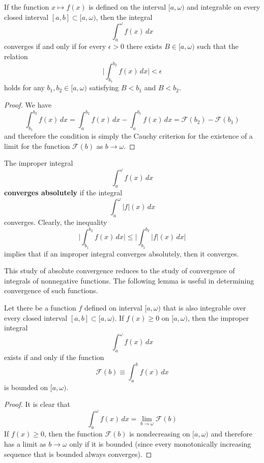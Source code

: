 \documentclass{article}
\begin{document}
        \begin{theorem}
        If the function $x \mapsto f(x)$ is defined on the interval $[a, \omega)$ and integrable on every closed interval $[a, b] \subset [a, \omega)$, then the integral 
        \[\int_a^\omega f(x)\,dx\]
        converges if and only if for every $\epsilon > 0$ there exists $B \in [a, \omega)$ such that the relation
        \[\Bigg| \int_{b_1}^{b_2} f(x)\,dx \bigg| < \epsilon\]
        holds for any $b_1, b_2 \in [a, \omega)$ satisfying $B < b_1$ and $B < b_2$. 
        \end{theorem}
        \begin{proof}
        We have
        \[\int_{b_1}^{b_2} f(x)\,dx = \int_a^{b_2} f(x)\,dx - \int_a^{b_1} f(x)\,dx = \mathcal{F}(b_2) - \mathcal{F}(b_1)\]
        and therefore the condition is simply the Cauchy criterion for the existence of a limit for the function $\mathcal{F}(b)$ as $b \rightarrow \omega$. 
        \end{proof}

        \begin{definition}
          The improper integral 
          \[\int_a^\omega f(x)\,dx\]
          \textbf{converges absolutely} if the integral
          \[\int_a^\omega |f|(x)\,dx\]
          converges. Clearly, the inequality
          \[\Bigg| \int_{b_1}^{b_2} f(x)\,dx \Bigg| \leq \Bigg| \int_{b_1}^{b_2} |f|(x)\,dx \Bigg|\]
          implies that if an improper integral converges absolutely, then it converges. 
        \end{definition}

        This study of absolute convergence reduces to the study of convergence of integrals of nonnegative functions. The following lemma is useful in determining convergence of such functions. 

        \begin{lemma}
          Let there be a function $f$ defined on interval $[a, \omega)$ that is also integrable over every closed interval $[a, b] \subset [a, \omega)$. If $f(x) \geq 0$ on $[a, \omega)$, then the improper integral 
          \[\int_a^\omega f(x)\,dx\]
          exists if and only if the function 
          \[\mathcal{F}(b) \equiv \int_a^b f(x)\,dx\]
          is bounded on $[a, \omega)$. 
        \end{lemma}
        \begin{proof}
        It is clear that 
        \[\int_a^\omega f(x)\,dx = \lim_{b \rightarrow \omega} \mathcal{F}(b)\]
        If $f(x)\geq 0$, then the function $\mathcal{F}(b)$ is nondecreasing on $[a, \omega)$ and therefore has a limit as $b \rightarrow \omega$ only if it is bounded (since every monotonically increasing sequence that is bounded always converges). 
        \end{proof}
\end{document}
